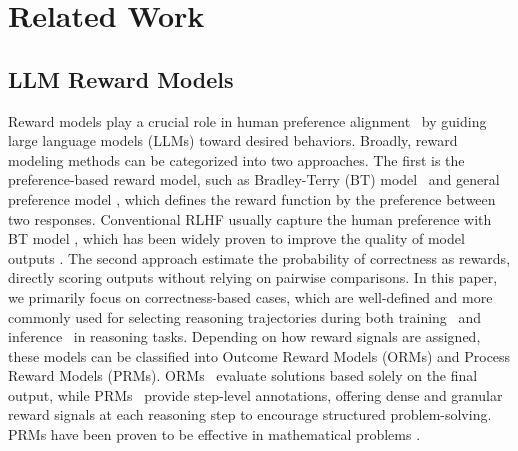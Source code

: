 \section{Related Work}
\label{sec:related}

\subsection{LLM Reward Models}
Reward models play a crucial role in human preference alignment~\citep{christiano2017deep,bai2022training,casper2023open} by guiding large language models (LLMs) toward desired behaviors. Broadly, reward modeling methods can be categorized into two approaches.
The first is the preference-based reward model, such as Bradley-Terry (BT) model~\citep{bradley1952rank,zhao2023slic,rafailov2024direct,ethayarajh2024kto,xiong2024iterative} and general preference model \citep{llm-blender-2023,munos2023nash,tang2024generalized,ye2025online,azar2024general}, which defines the reward function by the preference between two responses.
Conventional RLHF usually capture the human preference with BT model \citep{ouyang2022training,chatgpt}, which has been widely proven to improve the quality of model outputs \citep{dubey2024llama,dong2024rlhf,guo2024direct}.
The second approach estimate the probability of correctness as rewards, directly scoring outputs without relying on pairwise comparisons. 
In this paper, we primarily focus on correctness-based cases, which are well-defined and more commonly used for selecting reasoning trajectories during both training~\citep{chen2024alphamath,wang2024math} and inference~\citep{brown2024large} in reasoning tasks. Depending on how reward signals are assigned, these models can be classified into Outcome Reward Models (ORMs) and Process Reward Models (PRMs). ORMs~\citep{yu2023outcome} evaluate solutions based solely on the final output, while PRMs~\citep{lightman2023let} provide step-level annotations, offering dense and granular reward signals at each reasoning step to encourage structured problem-solving. PRMs have been proven to be effective in mathematical problems \citep{shao2024deepseekmath,snell2024scaling,luo2024improve,liao2025reward}. 



